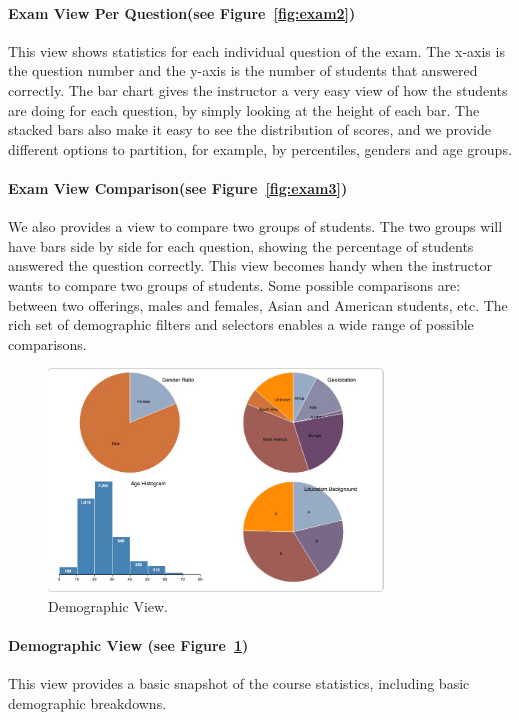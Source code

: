 \paragraph{Exam View Per Question(see Figure~\ref{fig:exam2})}
This view shows statistics for each individual question of the exam. The x-axis is the question number and the y-axis is the number of students that answered correctly. The bar chart gives the instructor a very easy view of how the students are doing for each question, by simply looking at the height of each bar. The stacked bars also make it easy to see the distribution of scores, and we provide different options to partition, for example, by percentiles, genders and age groups.

\paragraph{Exam View Comparison(see Figure~\ref{fig:exam3})}
We also provides a view to compare two groups of students. The two groups will have bars side by side for each question, showing the percentage of students answered the question correctly. This view becomes handy when the instructor wants to compare two groups of students. Some possible comparisons are: between two offerings, males and females, Asian and American students, etc. The rich set of demographic filters and selectors enables a wide range of possible comparisons.

\begin{figure}[htb]
 \centering
 \includegraphics[width=3.5in]{demo.jpg}
 \caption{Demographic View.}
  \label{fig:demo}	
\end{figure}

\paragraph{Demographic View (see Figure~\ref{fig:demo})}
This view provides a basic snapshot of the course statistics, including basic demographic breakdowns.

